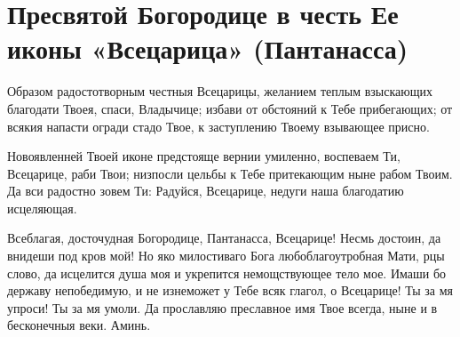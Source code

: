 \mychapterending



\section{Пресвятой Богородице в честь Ее иконы «Всецарица» (Пантанасса)}\begin{mymulticols}


Образом радостотворным честныя Всецарицы, желанием теплым взыскающих благодати Твоея, спаси, Владычице; избави от обстояний к Тебе прибегающих; от всякия напасти огради стадо Твое, к заступлению Твоему взывающее присно.


Новоявленней Твоей иконе предстояще вернии умиленно, воспеваем Ти, Всецарице, раби Твои; низпосли цельбы к Тебе притекающим ныне рабом Твоим. Да вси радостно зовем Ти: Радуйся, Всецарице, недуги наша благодатию исцеляющая.


Всеблагая, досточудная Богородице, Пантанасса, Всецарице! Несмь достоин, да внидеши под кров мой! Но яко милостиваго Бога любоблагоутробная Мати, рцы слово, да исцелится душа моя и укрепится немощствующее тело мое. Имаши бо державу непобедимую, и не изнеможет у Тебе всяк глагол, о Всецарице! Ты за мя упроси! Ты за мя умоли. Да прославляю преславное имя Твое всегда, ныне и в бесконечныя веки. Аминь.

\end{mymulticols}

